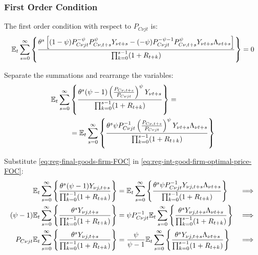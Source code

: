 \documentclass[
	thesis.tex
	]{subfiles}
\begin{document}

\subsubsection*{First Order Condition}

The first order condition with respect to $P_{C\nu jt}$ is:
\begin{align}
	& \quad {\mathbb{E}_{t}} \sum_{s=0}^{\infty} \left\{ \frac{\theta^s \left[ (1-\psi) P_{C\nu jt}^{-\psi} P_{C\nu, t+s}^{\psi} Y_{\nu t+s} - (-\psi) P_{C\nu jt}^{-\psi-1} P_{C\nu, t+s}^{\psi} Y_{\nu t+s} \Lambda_{\nu t+s} \right] }{\prod_{k=0}^{s-1}(1+R_{t+k})} \right\} = 0 \nonumber
\end{align}


Separate the summations and rearrange the variables:
\begin{align}
	\begin{split}
	{\mathbb{E}_{t}} \sum_{s=0}^{\infty} &\left\{ \frac{\theta^s (\psi-1) \left( \frac{P_{C\nu, t+s}} {P_{C\nu jt}} \right)^{\psi} Y_{\nu t+s}} {\prod_{k=0}^{s-1} (1+R_{t+k})} \right\} = \\
	&= {\mathbb{E}_{t}} \sum_{s=0}^{\infty} \left\{ \frac{\theta^s \psi P_{C\nu jt}^{-1} \left( \frac{P_{C\nu, t+s}} {P_{C\nu jt}} \right)^{\psi} Y_{\nu t+s} \Lambda_{\nu t+s} }{\prod_{k=0}^{s-1}(1+R_{t+k})} \right\} \label{eq:reg-int-good-firm-optimal-price-FOC}
	\end{split}
\end{align}


Substitute \ref{eq:reg-final-goods-firm-FOC} in \ref{eq:reg-int-good-firm-optimal-price-FOC}:
\begin{alignat}{2}
	{\mathbb{E}_{t}} \sum_{s=0}^{\infty} \Bigg\{ \frac{\theta^s (\psi-1) Y_{\nu j,t+s}}{\prod_{k=0}^{s-1}(1+R_{t+k})} \Bigg\} &= {\mathbb{E}_{t}} \sum_{s=0}^{\infty} \Bigg\{ \frac{\theta^s \psi P_{C\nu jt}^{-1} Y_{\nu j,t+s} \Lambda_{\nu t+s}}{\prod_{k=0}^{s-1}(1+R_{t+k})}  \Bigg\} &\implies \nonumber \\
	(\psi-1) {\mathbb{E}_{t}} \sum_{s=0}^{\infty} \Bigg\{ \frac{\theta^s Y_{\nu j,t+s}}{\prod_{k=0}^{s-1}(1+R_{t+k})} \Bigg\} &= \psi P_{C\nu jt}^{-1} {\mathbb{E}_{t}} \sum_{s=0}^{\infty} \Bigg\{ \frac{\theta^s Y_{\nu j,t+s} \Lambda_{\nu t+s}}{\prod_{k=0}^{s-1}(1+R_{t+k})}  \Bigg\} &\implies \nonumber \\
	P_{C\nu jt} {\mathbb{E}_{t}} \sum_{s=0}^{\infty} \Bigg\{ \frac{\theta^s Y_{\nu j,t+s}}{\prod_{k=0}^{s-1}(1+R_{t+k})} \Bigg\} &= \frac{\psi}{\psi-1} {\mathbb{E}_{t}} \sum_{s=0}^{\infty} \Bigg\{ \frac{\theta^s Y_{\nu j,t+s} \Lambda_{\nu t+s}}{\prod_{k=0}^{s-1}(1+R_{t+k})}  \Bigg\} &\implies \nonumber
\end{alignat}
\end{document}

